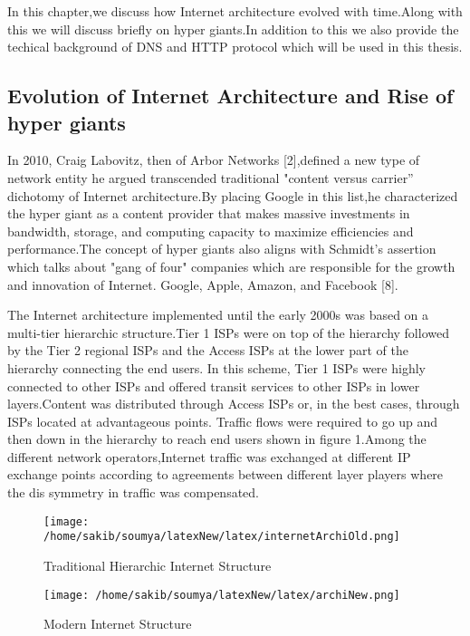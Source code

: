 In this chapter,we discuss how Internet architecture evolved with time.Along with this we will discuss briefly on hyper giants.In addition to this we also provide the techical background of DNS and HTTP protocol which will be used in this thesis.
  
\subsection{Evolution of Internet Architecture and Rise of hyper giants}
In 2010, Craig Labovitz, then of Arbor Networks [2],defined a new type of network entity he argued transcended traditional "content versus carrier” dichotomy of Internet architecture.By placing Google in this list,he characterized the hyper giant as a content provider that makes massive investments in bandwidth, storage, and computing capacity to maximize efficiencies and performance.The concept of hyper giants also aligns with Schmidt’s assertion which talks about "gang of four" companies which are responsible for the growth and innovation of Internet. Google, Apple, Amazon, and Facebook [8].

The Internet architecture implemented until the early 2000s was based on a multi-tier hierarchic structure.Tier 1 ISPs were on top of the hierarchy followed by the Tier 2 regional ISPs and the Access ISPs at the lower part of the hierarchy connecting the end users. In this scheme, Tier 1 ISPs were highly connected to other ISPs and offered transit services to other ISPs in lower layers.Content was distributed through Access ISPs or, in the best cases, through ISPs located at advantageous points. Traffic flows were required to go up and then down in the hierarchy to reach end users shown in figure 1.Among the different network operators,Internet traffic was exchanged at different IP exchange points according to agreements between different layer players where the dis symmetry in traffic was compensated.

\begin{figure}[h]
\texttt{[image: /home/sakib/soumya/latexNew/latex/internetArchiOld.png]}
\centering
\caption{Traditional Hierarchic Internet Structure}
\end{figure}

\begin{figure}[h]
\texttt{[image: /home/sakib/soumya/latexNew/latex/archiNew.png]}
\centering
\caption{Modern Internet Structure}
\end{figure}

